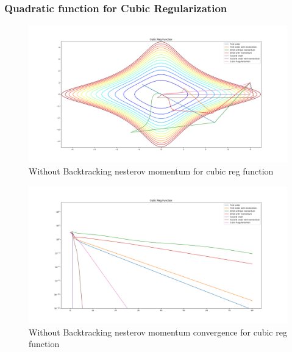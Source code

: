 \documentclass{article}
\begin{document}
\subsubsection{Quadratic function for Cubic Regularization}
\begin{center}
\begin{figure}[H]
	\includegraphics[width=\linewidth]{../Images/cubicregularizationnesterov.png}
	\caption{Without Backtracking nesterov momentum for cubic reg function}
	\label{fig:Without Backtracking nesterov momentum for cubic reg function}
\end{figure}

\begin{figure}[H]
	\includegraphics[width=\linewidth]{../Images/cubicregularizationnesterov1.png}
	\caption{Without Backtracking nesterov momentum convergence for cubic reg function}
	\label{fig:Without Backtracking nesterov momentum convergence for cubic reg function}
\end{figure}


\end{center}
\end{document}

